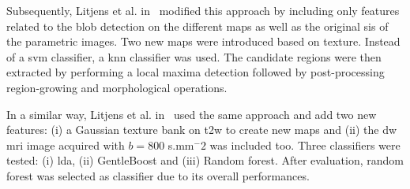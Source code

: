 Subsequently, Litjens et al. in~\cite{Litjens2012} modified this approach by including only features related to the blob detection on the different maps as well as the original \acp{si} of the parametric images. Two new maps were introduced based on texture. Instead of a \ac{svm} classifier, a \ac{knn} classifier was used. The candidate regions were then extracted by performing a local maxima detection followed by post-processing region-growing and morphological operations. 

In a similar way, Litjens et al. in~\cite{Litjens2014} used the same approach and add two new features: (i) a Gaussian texture bank on \ac{t2w} to create new maps and (ii) the \ac{dw} \ac{mri} image acquired with $b=800$ s.mm$^-2$ was included too. Three classifiers were tested: (i) \ac{lda}, (ii) GentleBoost and (iii) Random forest. After evaluation, random forest was selected as classifier due to its overall performances.

